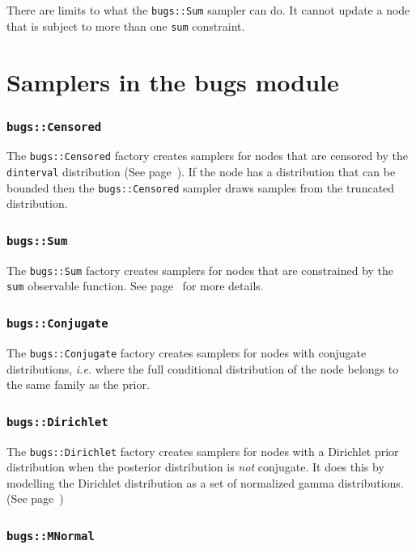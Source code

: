 \documentclass[11pt, a4paper, titlepage]{report}
\begin{document}
{There are limits to what the \texttt{bugs::Sum} sampler can do. It
cannot update a node that is subject to more than one \texttt{sum}
constraint.

\section{Samplers in the bugs module}


\subsubsection{\texttt{bugs::Censored}}

The \texttt{bugs::Censored} factory creates samplers for nodes that
are censored by the \texttt{dinterval} distribution (See
page~\pageref{bugs:dinterval}). If the node has a distribution that can be
bounded then the \texttt{bugs::Censored} sampler draws samples from
the truncated distribution.

\subsubsection{\texttt{bugs::Sum}}

The \texttt{bugs::Sum} factory creates samplers for nodes that are
constrained by the \texttt{sum} observable function. See
page~\pageref{bugs:sum} for more details.

\subsubsection{\texttt{bugs::Conjugate}}

The \texttt{bugs::Conjugate} factory creates samplers for nodes with
conjugate distributions, {\em i.e.} where the full conditional
distribution of the node belongs to the same family as the prior.

\subsubsection{\texttt{bugs::Dirichlet}}

The \texttt{bugs::Dirichlet} factory creates samplers for nodes with a
Dirichlet prior distribution when the posterior distribution is {\em
  not} conjugate. It does this by modelling the Dirichlet distribution
as a set of normalized gamma distributions. (See page~\pageref{bugs:ddirch})

\subsubsection{\texttt{bugs::MNormal}}

}
\end{document}
